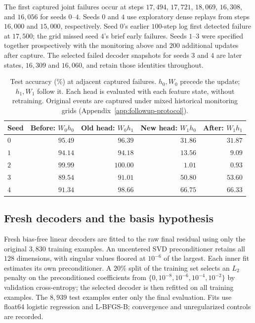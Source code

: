 The first captured joint failures occur at steps $17{,}494$, $17{,}721$, $18{,}069$, $16{,}308$, and $16{,}056$ for seeds $0$--$4$. Seeds $0$ and $4$ use exploratory dense replays from steps $16{,}000$ and $15{,}000$, respectively. Seed $0$'s earlier $100$-step log first detected failure at $17{,}500$; the grid missed seed $4$'s brief early failures. Seeds $1$--$3$ were specified together prospectively with the monitoring above and $200$ additional updates after capture. The selected failed decoder snapshots for seeds $3$ and $4$ are later states, $16{,}309$ and $16{,}060$, and retain those identities throughout.

\begin{table}[htbp]
\centering
\small
\caption{Test accuracy (\%) at adjacent captured failures. $h_0,W_0$ precede the update; $h_1,W_1$ follow it. Each head is evaluated with each feature state, without retraining. Original events are captured under mixed historical monitoring grids (Appendix~\ref{app:followup-protocol}).}
\label{tab:adjacent}
\begin{tabular}{lrrrr}
\toprule
Seed & Before: $W_0h_0$ & Old head: $W_0h_1$ & New head: $W_1h_0$ & After: $W_1h_1$ \\
\midrule
$0$ & $95.49$ & $96.39$ & $31.86$ & $31.87$ \\
$1$ & $94.14$ & $94.18$ & $13.56$ & $9.09$ \\
$2$ & $99.99$ & $100.00$ & $1.01$ & $0.93$ \\
$3$ & $89.54$ & $91.01$ & $50.80$ & $53.60$ \\
$4$ & $91.34$ & $98.66$ & $66.75$ & $66.33$ \\
\bottomrule
\end{tabular}
\end{table}

\subsection{Fresh decoders and the basis hypothesis}
\label{app:basis}

Fresh bias-free linear decoders are fitted to the raw final residual using only the original $3{,}830$ training examples. An uncentered SVD preconditioner retains all $128$ dimensions, with singular values floored at $10^{-6}$ of the largest. Each inner fit estimates its own preconditioner. A $20\%$ split of the training set selects an $L_2$ penalty on the preconditioned coefficients from $\{0,10^{-8},10^{-6},10^{-4},10^{-2}\}$ by validation cross-entropy; the selected decoder is then refitted on all training examples. The $8{,}939$ test examples enter only the final evaluation. Fits use float64 logistic regression and L-BFGS-B; convergence and unregularized controls are recorded.

